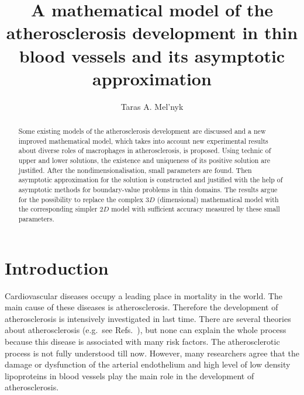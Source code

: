 \documentclass[reqno]{amsart}            %
\numberwithin{equation}{section}
\begin{document}
\title[A mathematical model of the atherosclerosis development in thin blood vessels]
{A mathematical model of the atherosclerosis development in thin blood vessels and its asymptotic approximation}
\author[T.A.~Mel'nyk]{ Taras A. Mel'nyk}
\address{\hskip-12pt  Faculty of Mathematics and Mechanics, Department of Mathematical Physics\\
Taras Shevchenko National University of Kyiv\\
Volodymyrska str. 64,\ 01601 Kyiv,  \ Ukraine
}


\begin{abstract}
Some existing models of the atherosclerosis development are discussed and
a new improved mathematical model, which takes into account new experimental results about diverse roles
of macrophages in atherosclerosis,  is proposed.
Using technic of upper and lower solutions, the existence and uniqueness of its positive solution are justified.
 After the nondimensionalisation, small parameters are found.
 Then asymptotic approximation for the solution is constructed and justified with the help of asymptotic methods for boundary-value problems
 in thin domains. The results argue for the possibility to replace the complex $3D$ (dimensional) mathematical model with the
corresponding simpler $2D$  model with sufficient accuracy measured by these small parameters.
\end{abstract}



\maketitle
\tableofcontents
\section{Introduction}	
Cardiovascular diseases occupy a leading place in mortality in the world. The main cause of these diseases is atherosclerosis.
Therefore the development of atherosclerosis is intensively investigated in last time. There are several theories about atherosclerosis (e.g.~see Refs.~\cite{Guyton,Fan-Wat,Osterud-Bjorklid,Ross}), but none can explain the whole process because this disease is associated with many risk factors. The atherosclerotic process is not fully understood till now.
However, many researchers agree that the damage or dysfunction of the arterial endothelium  and high level of low
density lipoproteins in blood vessels play the main role in the development of atherosclerosis.
\end{document}
